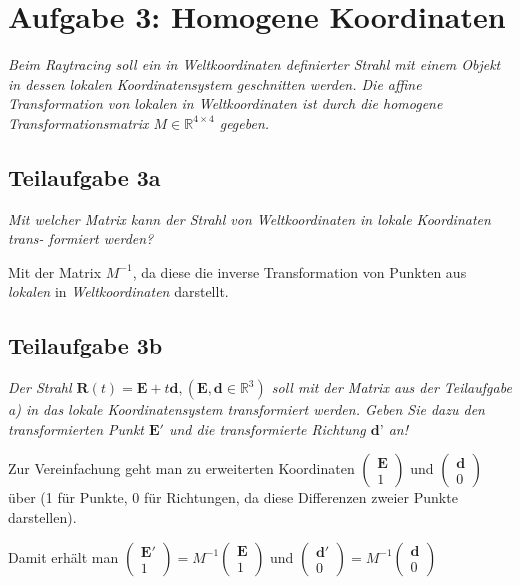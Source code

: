 \documentclass[a4paper]{scrartcl}
\begin{document}
\section*{Aufgabe 3: Homogene Koordinaten}
\textit{Beim Raytracing soll ein in Weltkoordinaten definierter Strahl mit einem Objekt in dessen
lokalen Koordinatensystem geschnitten werden. Die affine Transformation von lokalen in
Weltkoordinaten ist durch die homogene Transformationsmatrix $M \in \mathbb{R}^{4\times 4}$ gegeben.}
\subsection*{Teilaufgabe 3a}
\textit{Mit welcher Matrix kann der Strahl von Weltkoordinaten in lokale Koordinaten trans-
formiert werden?}

Mit der Matrix $M^{-1}$, da diese die inverse Transformation von Punkten aus \textit{lokalen} in \textit{Weltkoordinaten} darstellt.
\subsection*{Teilaufgabe 3b}
\textit{Der Strahl $\mathbf{R}(t) = \mathbf{E} + t \mathbf{d}, (\mathbf{E}, \mathbf{d} \in \mathbb{R}^3 )$ soll mit der Matrix aus der Teilaufgabe a) in das
lokale Koordinatensystem transformiert werden. Geben Sie dazu den transformierten
Punkt $\mathbf{E'}$ und die transformierte Richtung $\textbf{d'}$ an!}

Zur Vereinfachung geht man zu erweiterten Koordinaten $\begin{pmatrix}
\mathbf{E}\\1
\end{pmatrix}$ und $\begin{pmatrix}
\mathbf{d}\\0
\end{pmatrix}$ über (1 für Punkte, 0 für Richtungen, da diese Differenzen zweier Punkte darstellen).

Damit erhält man $\begin{pmatrix}
\mathbf{E'}\\1
\end{pmatrix} = M^{-1} \begin{pmatrix}
\mathbf{E}\\1
\end{pmatrix}$ und $\begin{pmatrix}
\mathbf{d'}\\0
\end{pmatrix} = M^{-1} \begin{pmatrix}
\mathbf{d}\\0
\end{pmatrix}$
\end{document}

